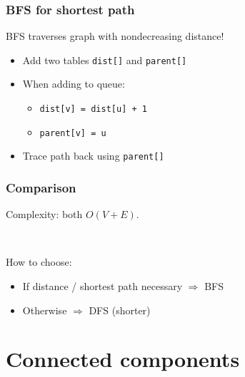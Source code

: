 \documentclass[12pt]{beamer}
\begin{document}
\begin{frame}
\frametitle{BFS for shortest path}
BFS traverses graph with nondecreasing distance!
\begin{itemize}
\item Add two tables \texttt{dist[]} and \texttt{parent[]}
\item When adding to queue:
    \begin{itemize}
    \item \lstinline[basicstyle=\normalsize]{dist[v] = dist[u] + 1}
    \item \lstinline[basicstyle=\normalsize]{parent[v] = u}
    \end{itemize}
\item Trace path back using \texttt{parent[]}
\end{itemize}
\end{frame}

\begin{frame}
\frametitle{Comparison}
Complexity: both $O(V+E)$.

~

How to choose:
\begin{itemize}
\item If distance / shortest path necessary $\Rightarrow$ BFS
\item Otherwise $\Rightarrow$ DFS (shorter)
\end{itemize}
\end{frame}

\section{Connected components}
\end{document}
